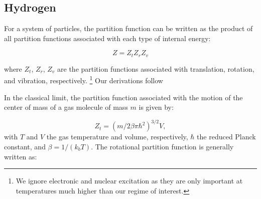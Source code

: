 \documentclass[apj]{emulateapj}
\begin{document}

\subsection{Hydrogen}

\label{hydrogen}

For a system of particles, the partition function can be written as the product of all partition functions associated with each type of internal energy:


\begin{equation}
\label{eq:zagain}
Z=Z_t Z_r Z_v
\end{equation} 

\noindent where $Z_t$, $Z_r$, $Z_v$ are the partition functions associated with translation, rotation, and vibration, respectively. \footnote{We ignore electronic and nuclear excitation as they are only important at temperatures much higher than our regime of interest.} Our derivations follow \citet{kittel} %


In the classical limit, the partition function associated with the motion of the center of mass of a gas molecule of mass $m$ is given by:

\begin{equation}
\label{eq:Zt}
Z_t=(m/2 \beta \pi \hbar^2)^{3/2} V,
\end{equation}
with  $T$ and $V$ the gas temperature and volume, respectively, $\hbar$ the reduced Planck constant, and  $\beta=1/(k_b T)$. The rotational partition function is generally written as:
\end{document}
